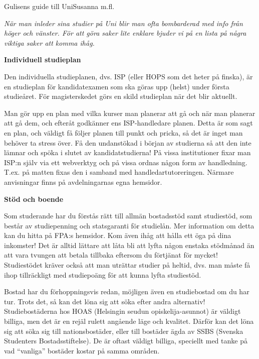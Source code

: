 \documentclass{spektraklet}
\begin{document}
\begin{artikel}{Gulisens guide till Uni}{Susanna m.fl.}

\textit{När man inleder sina studier på Uni blir man ofta bombarderad med info från höger och vänster. För att göra saker lite enklare bjuder vi på en lista på några viktiga saker att komma ihåg.}

\textbf{Individuell studieplan}

Den individuella studieplanen, dvs. ISP (eller HOPS som det heter på finska), är en studieplan för kandidatexamen som ska göras upp (helst) under första studieåret. För magisterskedet görs en skild studieplan när det blir aktuellt.

Man gör upp en plan med vilka kurser man planerar att gå och när man planerar att gå dem, och efteråt godkänner ens ISP-handledare planen. Detta är som sagt en plan, och väldigt få följer planen till punkt och pricka, så det är inget man behöver ta stress över. Få den undanstökad i början av studierna så att den inte lämnar och spöka i slutet av kandidatstudierna! På vissa institutioner fixar man ISP:n själv via ett webverktyg och på vissa ordnas någon form av handledning. T.ex. på matten fixas den i samband med handledartutoreringen. Närmare anvisningar finns på avdelningarnas egna hemsidor.

\textbf{Stöd och boende}

Som studerande har du förstås rätt till allmän bostadsstöd samt studiestöd, som består av studiepenning och statsgaranti för studielån. Mer information om detta kan du hitta på FPA:s hemsidor. Kom även ihåg att hålla ett öga på dina inkomster! Det är alltid lättare att låta bli att lyfta någon enstaka stödmånad än att vara tvungen att betala tillbaka eftersom du förtjänat för mycket! Studiestödet kräver också att man uträttar studier på heltid, dvs. man måste få ihop tillräckligt med studiepoäng för att kunna lyfta studiestöd.

Bostad har du förhoppningsvis redan, möjligen även en studiebostad om du har tur. Trots det, så kan det löna sig att söka efter andra alternativ! Studiebostäderna hos HOAS (Helsingin seudun opiskelija-asunnot) är väldigt billiga, men det är en rejäl rulett angående läge och kvalitet. Därför kan det löna sig att söka sig till nationsbostäder, eller till bostäder ägda av SSBS (Svenska Studenters Bostadsstiftelse). De är oftast väldigt billiga, speciellt med tanke på vad “vanliga” bostäder kostar på samma områden.

\newpage


\end{artikel}
\end{document}
